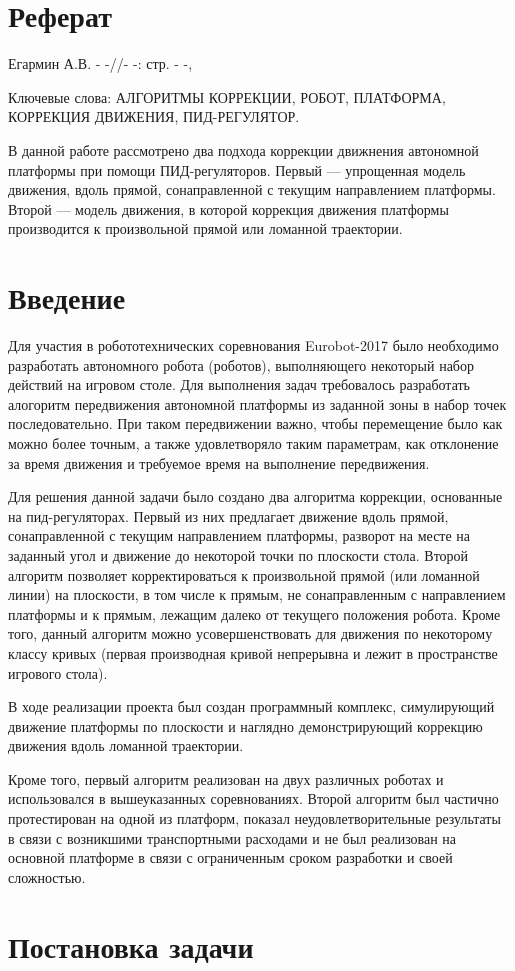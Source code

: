 \documentclass[12pt]{report}
\begin{document}
\newpage
\pagestyle{plain} %
\chapter*{Реферат}
Егармин А.В. - -//- -: стр. - -,

Ключевые слова: АЛГОРИТМЫ КОРРЕКЦИИ, РОБОТ, ПЛАТФОРМА, КОРРЕКЦИЯ ДВИЖЕНИЯ, ПИД-РЕГУЛЯТОР.

В данной работе рассмотрено два подхода коррекции движнения автономной платформы при помощи ПИД-регуляторов. Первый --- упрощенная модель движения, вдоль прямой, сонаправленной с текущим направлением платформы. Второй --- модель движения, в которой коррекция движения платформы производится к произвольной прямой или ломанной траектории.

\newpage
\tableofcontents

\chapter{Введение}
Для участия в робототехнических соревнования Eurobot-2017 было необходимо разработать автономного робота (роботов), выполняющего некоторый набор действий на игровом столе. Для выполнения задач требовалось разработать алогоритм передвижения автономной платформы из заданной зоны в набор точек последовательно. При таком передвижении важно, чтобы перемещение было как можно более точным, а также удовлетворяло таким параметрам, как отклонение за время движения и требуемое время на выполнение передвижения.

Для решения данной задачи было создано два алгоритма коррекции, основанные на пид-регуляторах. Первый из них предлагает движение вдоль прямой, сонаправленной с текущим направлением платформы, разворот на месте на заданный угол и движение до некоторой точки по плоскости стола. Второй алгоритм позволяет корректироваться к произвольной прямой (или ломанной линии) на плоскости, в том числе к прямым, не сонаправленным с направлением платформы и к прямым, лежащим далеко от текущего положения робота. Кроме того, данный алгоритм можно усовершенствовать для движения по некоторому классу кривых (первая производная кривой непрерывна и лежит в пространстве игрового стола).

В ходе реализации проекта был создан программный комплекс, симулирующий движение платформы по плоскости и наглядно демонстрирующий коррекцию движения вдоль ломанной траектории.

Кроме того, первый алгоритм реализован на двух различных роботах и использовался в вышеуказанных соревнованиях. Второй алгоритм был частично протестирован на одной из платформ, показал неудовлетворительные результаты в связи с возникшими транспортными расходами и не был реализован на основной платформе в связи с ограниченным сроком разработки и своей сложностью.

\chapter{Постановка задачи}
\end{document}
